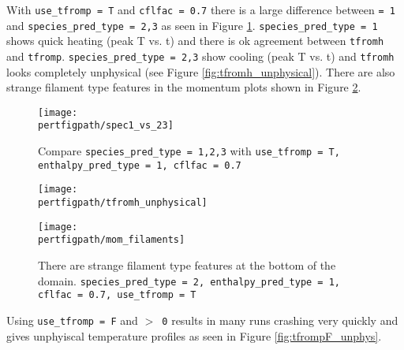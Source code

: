 With {\tt use\_tfromp = T} and {\tt cflfac = 0.7} there is a large difference 
between  {\tt = 1} and {\tt species\_pred\_type = 2,3} as 
seen in Figure \ref{fig:spec1_vs_23}. {\tt species\_pred\_type = 1} shows 
quick heating (peak T vs. t) and there is ok agreement between {\tt tfromh} 
and {\tt tfromp}. {\tt species\_pred\_type = 2,3} show cooling (peak T vs. t) 
and {\tt tfromh} looks completely unphysical (see Figure 
\ref{fig:tfromh_unphysical}). There are also strange filament type features in 
the momentum plots shown in Figure \ref{fig:mom_filaments}.

\begin{figure}[!h]
\centering
\texttt{[image: \\pertfigpath/spec1\_vs\_23]}
\caption{Compare {\tt species\_pred\_type = 1,2,3} with {\tt use\_tfromp = 
T, enthalpy\_pred\_type = 1, cflfac = 0.7}}
\label{fig:spec1_vs_23}
\end{figure}

\begin{figure}[!h]
\begin{minipage}[b]{0.5\linewidth}
\vspace{0pt}
\centering
\texttt{[image: \\pertfigpath/tfromh\_unphysical]}
\caption{{\tt tfromh} is unphysical when using {\tt species\_pred\_type = 
2,3, enthalpy\_pred\_type = 1, cflfac = 0.7, use\_tfromp = T}. Shown above 
is {\tt species\_pred\_type = 2}}
\label{fig:tfromh_unphysical}
\end{minipage}
\hspace{0.5cm}
\begin{minipage}[b]{0.5\linewidth}
\vspace{0pt}
\centering
\texttt{[image: \\pertfigpath/mom\_filaments]}
\caption{There are strange filament type features at the bottom of the 
domain. {\tt species\_pred\_type = 2, enthalpy\_pred\_type = 1, cflfac = 0.7, 
use\_tfromp = T}}
\label{fig:mom_filaments}
\end{minipage}
\end{figure}

Using {\tt use\_tfromp = F} and  {\tt $>$ 0} results in many runs 
crashing very quickly and gives unphyiscal temperature profiles as seen in 
Figure \ref{fig:tfrompF_unphys}.

